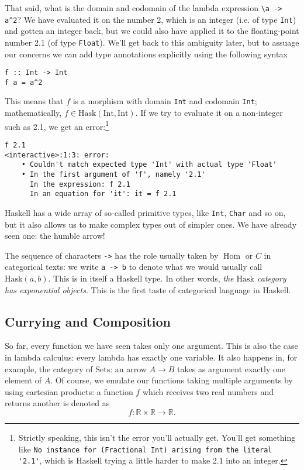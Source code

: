 \documentclass[11pt]{article}
\theoremstyle{nonumberplain}
\newcommand{\R}{\mathbb{R}}
\newcommand{\Hask}{\mathrm{Hask}}
\newcommand{\type}[1]{\mathrm{#1}}
\newcommand{\cat}[1]{\mathrm{#1}}
\DeclareMathOperator{\Hom}{Hom}
\newcommand*\lsin{\lstinline}
\begin{document}
That said, what is the domain and codomain of the lambda expression \lstinline|\a -> a^2|? We have evaluated it on the number 2, which is an integer (i.e. of type \lstinline|Int|) and gotten an integer back, but we could also have applied it to the floating-point number 2.1 (of type \lstinline|Float|). We'll get back to this ambiguity later, but to assuage our concerns we can add type annotations explicitly using the following syntax
\begin{lstlisting}
f :: Int -> Int
f a = a^2
\end{lstlisting}

This means that $f$ is a morphism with domain \lstinline|Int| and codomain \lstinline|Int|; mathematically, $f \in \Hask(\type{Int}, \type{Int})$. If we try to evaluate it on a non-integer such as 2.1, we get an error:\footnote{Strictly speaking, this isn't the error you'll actually get. You'll get something like \lstinline|No instance for (Fractional Int) arising from the literal '2.1'|, which is Haskell trying a little harder to make 2.1 into an integer.}
\begin{lstlisting}
f 2.1
<interactive>:1:3: error:
    • Couldn't match expected type 'Int' with actual type 'Float'
    • In the first argument of 'f', namely '2.1'
      In the expression: f 2.1
      In an equation for 'it': it = f 2.1
\end{lstlisting}

Haskell has a wide array of so-called primitive types, like \lstinline|Int|, \lstinline|Char| and so on, but it also allows us to make complex types out of simpler ones. We have already seen one: the humble arrow!

The sequence of characters \lstinline|->| has the role usually taken by $\Hom$ or $C$ in categorical texts: we write \lsin|a -> b| to denote what we would usually call $\Hask(a,b)$. This is in itself a Haskell type. In other words, \emph{the $\Hask$ category has exponential objects}. This is the first taste of categorical language in Haskell.

\subsection{Currying and Composition}

So far, every function we have seen takes only one argument. This is also the case in lambda calculus: every lambda has exactly one variable. It also happens in, for example, the category of $\cat{Sets}$: an arrow $A \to B$ takes as argument exactly one element of $A$. Of course, we emulate our functions taking multiple arguments by using cartesian products: a function $f$ which receives two real numbers and returns another is denoted as
\begin{equation}
f \colon \R \times \R \to \R.
\end{equation}
\end{document}
